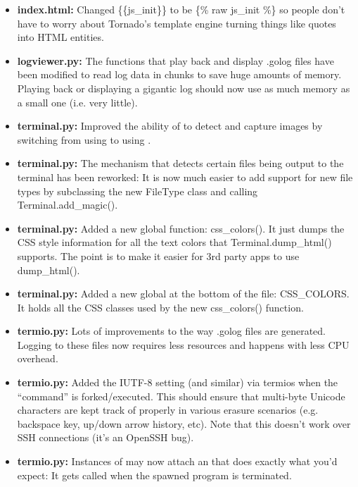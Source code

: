 \documentclass[letterpaper,10pt,openany]{sphinxmanual}
\begin{document}
\begin{itemize}
\item {} 
\textbf{index.html:}  Changed \{\{js\_init\}\} to be \{\% raw js\_init \%\} so people don't have to worry about Tornado's template engine turning things like quotes into HTML entities.

\item {} 
\textbf{logviewer.py:}  The functions that play back and display .golog files have been modified to read log data in chunks to save huge amounts of memory.  Playing back or displaying a gigantic log should now use as much memory as a small one (i.e. very little).

\item {} 
\textbf{terminal.py:}  Improved the ability of  to detect and capture images by switching from using  to using .

\item {} 
\textbf{terminal.py:}  The mechanism that detects certain files being output to the terminal has been reworked:  It is now much easier to add support for new file types by subclassing the new FileType class and calling Terminal.add\_magic().

\item {} 
\textbf{terminal.py:}  Added a new global function:  css\_colors().  It just dumps the CSS style information for all the text colors that Terminal.dump\_html() supports.  The point is to make it easier for 3rd party apps to use dump\_html().

\item {} 
\textbf{terminal.py:}  Added a new global at the bottom of the file:  CSS\_COLORS.  It holds all the CSS classes used by the new css\_colors() function.

\item {} 
\textbf{termio.py:}  Lots of improvements to the way .golog files are generated.  Logging to these files now requires less resources and happens with less CPU overhead.

\item {} 
\textbf{termio.py:}  Added the IUTF-8 setting (and similar) via termios when the ``command'' is forked/executed.  This should ensure that multi-byte Unicode characters are kept track of properly in various erasure scenarios (e.g. backspace key, up/down arrow history, etc).  Note that this doesn't work over SSH connections (it's an OpenSSH bug).

\item {} 
\textbf{termio.py:}  Instances of  may now attach an  that does exactly what you'd expect:  It gets called when the spawned program is terminated.


\end{itemize}
\end{document}

